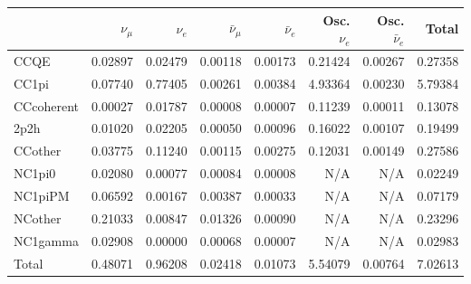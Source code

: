 \begin{tabular} { | l ||r | r | r | r | r | r | | r | }
\hline
              & $\nu_\mu$            & $\nu_e$              & $\bar{\nu}_{\mu}$    & $\bar{\nu}_{e}$      & Osc. $\nu_e$         & Osc. $\bar{\nu}_{e}$ & Total                \\ \hline\hline
 CCQE         & 0.02897              & 0.02479              & 0.00118              & 0.00173              & 0.21424              & 0.00267              & 0.27358              \\ \hline
 CC1pi        & 0.07740              & 0.77405              & 0.00261              & 0.00384              & 4.93364              & 0.00230              & 5.79384              \\ \hline
 CCcoherent   & 0.00027              & 0.01787              & 0.00008              & 0.00007              & 0.11239              & 0.00011              & 0.13078              \\ \hline
 2p2h         & 0.01020              & 0.02205              & 0.00050              & 0.00096              & 0.16022              & 0.00107              & 0.19499              \\ \hline
 CCother      & 0.03775              & 0.11240              & 0.00115              & 0.00275              & 0.12031              & 0.00149              & 0.27586              \\ \hline
 NC1pi0       & 0.02080              & 0.00077              & 0.00084              & 0.00008              & N/A                  & N/A                  & 0.02249              \\ \hline
 NC1piPM      & 0.06592              & 0.00167              & 0.00387              & 0.00033              & N/A                  & N/A                  & 0.07179              \\ \hline
 NCother      & 0.21033              & 0.00847              & 0.01326              & 0.00090              & N/A                  & N/A                  & 0.23296              \\ \hline
 NC1gamma     & 0.02908              & 0.00000              & 0.00068              & 0.00007              & N/A                  & N/A                  & 0.02983              \\ \hline
\hline
 Total        & 0.48071              & 0.96208              & 0.02418              & 0.01073              & 5.54079              & 0.00764              & 7.02613              \\ \hline

\end{tabular}
